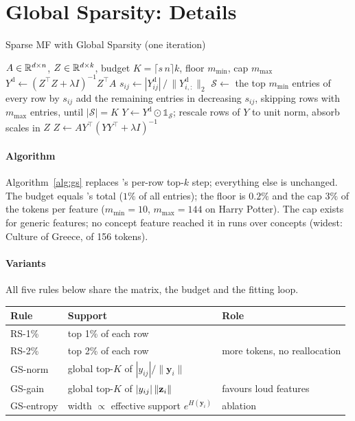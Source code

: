 \section{Global Sparsity: Details}
\label{app:gs}

\begin{algorithm}[t]
\caption{Sparse MF with Global Sparsity (one iteration)}
\label{alg:gs}
\small
\begin{algorithmic}[1]
\Require $A \in \mathbb{R}^{d\times n}$, $Z \in \mathbb{R}^{d\times k}$, budget $K = \lceil s\,n\rceil k$, floor $m_{\min}$, cap $m_{\max}$
\State $Y^{\mathrm{d}} \gets (Z^{\top}Z + \lambda I)^{-1}Z^{\top}A$ 
\State $s_{ij} \gets |Y^{\mathrm{d}}_{ij}| \,/\, \|Y^{\mathrm{d}}_{i,:}\|_2$ 
\State $\mathcal S \gets$ the top $m_{\min}$ entries of every row by $s_{ij}$
\State add the remaining entries in decreasing $s_{ij}$, skipping rows with $m_{\max}$ entries, until $|\mathcal S| = K$
\State $Y \gets Y^{\mathrm{d}} \odot \mathbb 1_{\mathcal S}$; rescale rows of $Y$ to unit norm, absorb scales in $Z$
\State $Z \gets AY^{\top}(YY^{\top} + \lambda I)^{-1}$
\end{algorithmic}
\end{algorithm}

\paragraph{Algorithm}
Algorithm~\ref{alg:gs} replaces \ember{}'s per-row top-$k$ step; everything else is unchanged.
The budget equals \ember{}'s total ($1\%$ of all entries); the floor is $0.2\%$ and the cap $3\%$ of the tokens per feature ($m_{\min} = 10$, $m_{\max} = 144$ on Harry Potter).
The cap exists for generic features; no concept feature reached it in  runs over  concepts (widest: Culture of Greece,  of 156 tokens).

\paragraph{Variants}
All five rules below share the matrix, the budget and the fitting loop.

\begin{center}
\small
\setlength{\tabcolsep}{3pt}
\begin{tabular}{@{}lP{2.9cm}P{2.1cm}@{}}
\toprule
Rule & Support & Role \\
\midrule
RS-1\% & top 1\% of each row & \ember{} \\
RS-2\% & top 2\% of each row & more tokens, no reallocation \\
GS-norm & global top-$K$ of $|y_{ij}|/\|\mathbf y_i\|$ & \cinder{} \\
GS-gain & global top-$K$ of $|y_{ij}|\,\|\mathbf{z}_i\|$ & favours loud features \\
GS-entropy & width $\propto$ effective support $e^{H(\mathbf y_i)}$ & ablation \\
\bottomrule
\end{tabular}
\end{center}

